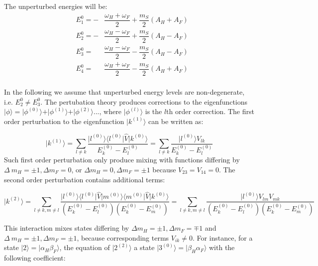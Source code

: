 \documentclass[a4paper, 12pt]{article}
\begin{document}
The unperturbed energies will be:
\begin{equation}\label{eq:level_energies}
	\begin{array}{lll}
  &E_1^{0} = - &\dfrac{\omega_H + \omega_F}{2} + \dfrac{m_S}{2}(A_H + A_F) \\
  &E_2^{0} = - &\dfrac{\omega_H - \omega_F}{2} + \dfrac{m_S}{2}(A_H - A_F) \\
  &E_3^{0} =  &\dfrac{\omega_H - \omega_F}{2} - \dfrac{m_S}{2}(A_H - A_F) \\
  &E_4^{0} =  &\dfrac{\omega_H + \omega_F}{2} - \dfrac{m_S}{2}(A_H + A_F) \\

	\end{array}
\end{equation}

In the following we assume that unperturbed energy levels are non-degenerate, i.e. $E_2^0 \neq E_3^0$.
The pertubation theory produces corrections to the eigenfunctions $\vert \phi \rangle = \vert \phi^{(0)} \rangle + \vert \phi^{(1)} \rangle + \vert \phi^{(2)} \rangle ...$, where $\vert \phi^{(l)} \rangle$ is the $l$th order correction. The first order perturbation to the eigenfunction $\vert k^{(1)} \rangle $ can be written as:

\begin{equation}
     \vert k^{(1)} \rangle = \sum_{l \neq k} \dfrac{\vert l^{(0)}  \rangle  \langle l^{(0)}  \vert \hat{V}  \vert k^{(0)} \rangle  }{E_k^{(0)} - E_l^{(0)}} = \sum_{l \neq k} \dfrac{\vert l^{(0)}  \rangle  V_{lk} }{E_k^{(0)} - E_l^{(0)}} 
\end{equation}
Such first order perturbation only produce mixing with functions differing by $\Delta \ m_H = \pm 1, \Delta m_F =0$, or  $\Delta m_H = 0, \Delta m_F =\pm 1$ because $V_{23} = V_{14} = 0$. The second order perturbation contains additional terms:

\begin{equation}
\vert k^{(2)} \rangle = \sum_{l \neq k, m \neq l } \dfrac{\vert l^{(0)}  \rangle  \langle l^{(0)}  \vert \hat{V}  \vert m^{(0)} \rangle   \langle m^{(0)}  \vert \hat{V}  \vert k^{(0)} \rangle  }{(E_k^{(0)} - E_l^{(0)})(E_k^{(0)} - E_m^{(0)})} = \sum_{l \neq k, m \neq l} \dfrac{\vert l^{(0)}  \rangle  V_{lm} V_{mk} }{(E_k^{(0)} - E_l^{(0)})(E_k^{(0)} - E_m^{(0)})} 
\end{equation}

This interaction mixes states differing by  $\Delta m_H = \pm 1, \Delta m_F =\mp 1$ and $\Delta \ m_H = \pm 1, \Delta m_F =\pm 1$, because corresponding terms $V_{ik} \neq 0$. For instance, for a state $\vert 2 \rangle = \vert \alpha_H \beta_F \rangle  $, the equation of $\vert 2^{(2)} \rangle $ a state $\vert 3^{(0)} \rangle = \vert \beta_H \alpha_F \rangle  $ with the following coefficient:
\end{document}
